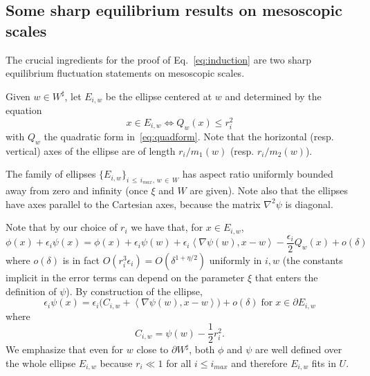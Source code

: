 \documentclass[AHL,Unicode,longabstracts,published]{cedram}
\renewcommand{\d}{{\sharp }}
\begin{document}
\subsection{Some sharp equilibrium results on mesoscopic scales}\label{sec:statement_equilibrium}

The crucial ingredients for the proof of Eq.~\eqref{eq:induction} are two sharp equilibrium fluctuation statements on mesoscopic scales.
\begin{defi}\label{def:Eiw}
Given $w \in W^\d$, let $E_{i,w}$ be the ellipse centered at $w$ and determined by the equation
\begin{equation}\label{eq:qformconst}
x\in E_{i,w}\Leftrightarrow Q_w(x)\le r_i^2
\end{equation}
with $Q_w$ the quadratic form in~\eqref{eq:quadform}. Note that the horizontal (resp. vertical) axes of the ellipse are of length $r_i/m_1(w)$ (resp. $r_i/m_2(w)$).
\end{defi}

\begin{rema}\label{rem:ellissi}
The family of ellipses $\{E_{i,w}\}_{i\,\le\,i_{max},\,w\,\in\,W}$ has aspect ratio uniformly bounded away from zero and infinity (once $\xi$ and $W$ are given). Note also that the ellipses have axes parallel to the Cartesian axes, because the matrix $\nabla^2\psi$ is diagonal.
\end{rema}

Note that by our choice of $r_i$ we have that, for $x\in E_{i,w}$,
\begin{equation}\label{eq:skoda}
\phi(x)+ \epsilon_{i}\psi(x) =\phi(x)+\epsilon_i\psi(w)+\epsilon_i \left\langle \nabla\psi(w), x-w\right\rangle-\frac{\epsilon_i}2 Q_w(x)+o(\delta)
\end{equation}
where $o(\delta)$ is in fact $O(r_i^3\epsilon_i)=O(
\delta^{1+\eta/2})$ uniformly in $i,w$ (the constants implicit in the error terms can depend on the parameter $\xi$ that enters the definition of $\psi$). By construction of the ellipse,
\begin{equation}\label{bcku}
\epsilon_{i}\psi(x)=\epsilon_i\Big(C_{i,w}+ \left\langle \nabla\psi(w), x-w\right\rangle\Big) +o(\delta) \;\text{for}\; x\in \partial E_{i,w}
\end{equation}
where
\begin{equation}\label{eq:C'}
C_{i,w}=\psi(w)-\frac12 r_i^2.
\end{equation}
We emphasize that even for $w$ close to $\partial W^\d$, both $\phi$ and $\psi$ are well defined over the whole ellipse $E_{i,w}$ because $r_i\ll1$ for all $i\le i_{max}$ and therefore $E_{i,w}$ fits in $U$.
\end{document}

